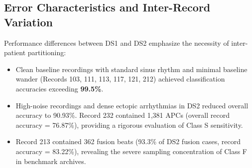 \documentclass[conference]{IEEEtran}
\begin{document}
\subsection{Error Characteristics and Inter-Record Variation}
Performance differences between DS1 and DS2 emphasize the necessity of inter-patient partitioning:
\begin{itemize}
    \item Clean baseline recordings with standard sinus rhythm and minimal baseline wander (Records 103, 111, 113, 117, 121, 212) achieved classification accuracies exceeding \textbf{99.5\%}.
    \item High-noise recordings and dense ectopic arrhythmias in DS2 reduced overall accuracy to 90.93\%. Record 232 contained 1,381 APCs (overall record accuracy = 76.87\%), providing a rigorous evaluation of Class S sensitivity.
    \item Record 213 contained 362 fusion beats (93.3\% of DS2 fusion cases, record accuracy = 83.22\%), revealing the severe sampling concentration of Class F in benchmark archives.
\end{itemize}
\end{document}
